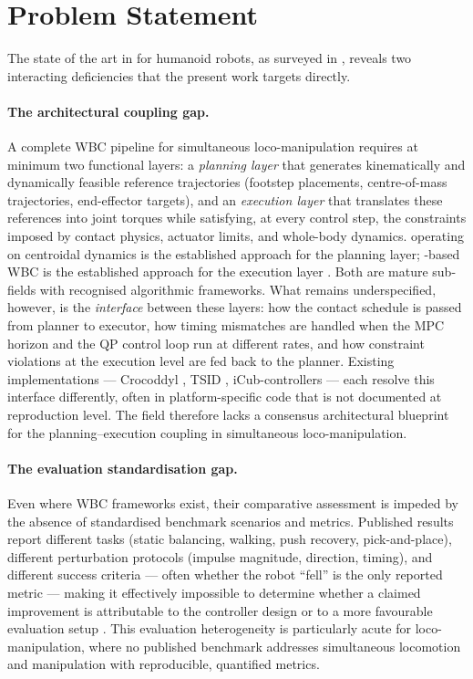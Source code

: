 \section{Problem Statement}
\label{sec:problem}

The state of the art in \WBC{} for humanoid robots, as surveyed in
, reveals two interacting deficiencies that the present
work targets directly.

\paragraph{The architectural coupling gap.}
A complete WBC pipeline for simultaneous loco-manipulation requires at
minimum two functional layers: a \emph{planning layer} that generates
kinematically and dynamically feasible reference trajectories (footstep
placements, centre-of-mass trajectories, end-effector targets), and an
\emph{execution layer} that translates these references into joint
torques while satisfying, at every control step, the constraints imposed
by contact physics, actuator limits, and whole-body dynamics.
\MPC{} operating on centroidal dynamics \cite{Orin2013} is the
established approach for the planning layer; \QP{}-based WBC is the
established approach for the execution layer \cite{Wensing2013,Koolen2016}.
Both are mature sub-fields with recognised algorithmic frameworks.
What remains underspecified, however, is the \emph{interface} between
these layers: how the contact schedule is passed from planner to
executor, how timing mismatches are handled when the MPC horizon and
the QP control loop run at different rates, and how constraint
violations at the execution level are fed back to the planner.
Existing implementations — Crocoddyl \cite{Crocoddyl}, TSID
\cite{DelPrete2016}, iCub-controllers \cite{Elobaid2023} — each resolve
this interface differently, often in platform-specific code that is not
documented at reproduction level. The field therefore lacks a consensus
architectural blueprint for the planning--execution coupling in
simultaneous loco-manipulation.

\paragraph{The evaluation standardisation gap.}
Even where WBC frameworks exist, their comparative assessment is
impeded by the absence of standardised benchmark scenarios and metrics.
Published results report different tasks (static balancing, walking,
push recovery, pick-and-place), different perturbation protocols
(impulse magnitude, direction, timing), and different success criteria —
often whether the robot ``fell'' is the only reported metric —
making it effectively impossible to determine whether a claimed
improvement is attributable to the controller design or to a more
favourable evaluation setup \cite{Sferrazza2024}. This evaluation
heterogeneity is particularly acute for loco-manipulation, where no
published benchmark addresses simultaneous locomotion and manipulation
with reproducible, quantified metrics.

